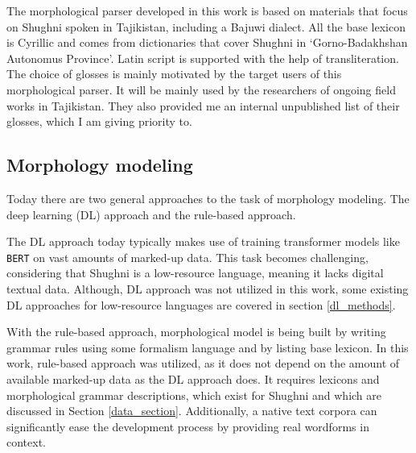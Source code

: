 The morphological parser developed in this work is based on materials that focus on Shughni spoken in Tajikistan, including a Bajuwi dialect. All the base lexicon is Cyrillic and comes from dictionaries that cover Shughni in `Gorno-Badakhshan Autonomus Province'. Latin script is supported with the help of transliteration. The choice of glosses is mainly motivated by the target users of this morphological parser. It will be mainly used by the researchers of ongoing field works in Tajikistan. They also provided me an internal unpublished list of their glosses, which I am giving priority to.

\subsection{Morphology modeling}
Today there are two general approaches to the task of morphology modeling. The deep learning (DL) approach and the rule-based approach. 

The DL approach today typically makes use of training transformer models like \texttt{BERT} \parencite{devlin_2019} on vast amounts of marked-up data. This task becomes challenging, considering that Shughni is a low-resource language, meaning it lacks digital textual data. Although, DL approach was not utilized in this work, some existing DL approaches for low-resource languages are covered in section \ref{dl_methods}.

With the rule-based approach, morphological model is being built by writing grammar rules using some formalism language and by listing base lexicon. In this work, rule-based approach was utilized, as it does not depend on the amount of available marked-up data as the DL approach does. It requires lexicons and morphological grammar descriptions, which exist for Shughni and which are discussed in Section \ref{data_section}. Additionally, a native text corpora can significantly ease the development process by providing real wordforms in context.
